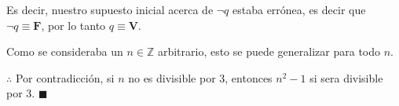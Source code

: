 \documentclass[legalpaper,10pt]{article}
\begin{document}
\begin{enumerate}[a)]
Es decir, nuestro supuesto inicial acerca de \(\lnot q\) estaba errónea, es decir que \(\lnot q \equiv \textbf{F}\), por lo tanto \(q \equiv \textbf{V}\).

Como se consideraba un \(n \in \mathbb{Z}\) arbitrario, esto se puede generalizar para todo \(n\).

\(\therefore\) Por contradicción, si \(n\) no es divisible por 3, entonces \(n^2 - 1\) si sera divisible por 3. \hfill \(\blacksquare\)

\end{enumerate}

\end{document}

